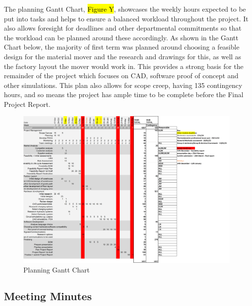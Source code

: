 \documentclass[12pt]{article}
\begin{document}
The planning Gantt Chart, \hl{Figure Y}, showcases the weekly hours expected to be put into tasks and helps to ensure a balanced workload throughout the project. It also allows foresight for deadlines and other departmental commitments so that the workload can be planned around these accordingly. As shown in the Gantt Chart below, the majority of first term was planned around choosing a feasible design for the material mover and the research and drawings for this, as well as the factory layout the mover would work in. This provides a strong basis for the remainder of the project which focuses on CAD, software proof of concept and other simulations. This plan also allows for scope creep, having 135 contingency hours, and so means the project has ample time to be complete before the Final Project Report.
\begin{figure}
    \centering
    \includegraphics[width=0.9\linewidth]{even bigger gantt chart.png}
    \caption{Planning Gantt Chart}
    \label{fig:y}
\end{figure}
\subsection{Meeting Minutes}

 \newpage
%
%
\end{document}
